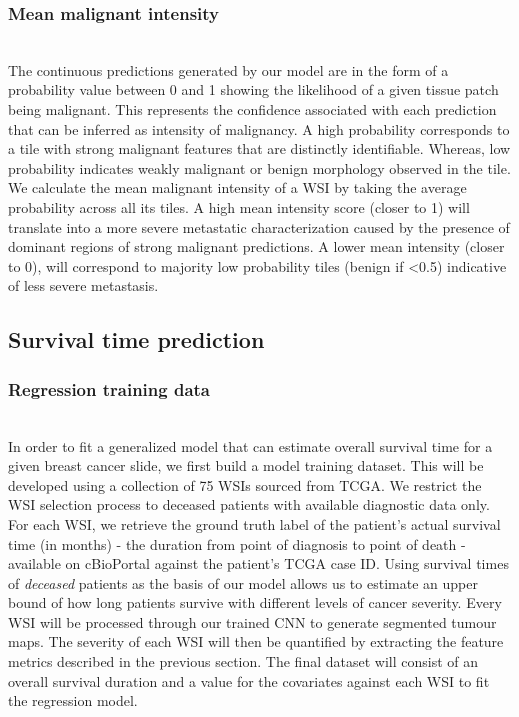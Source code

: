 \documentclass{l4proj}
\begin{document}
\subsubsection{Mean malignant intensity}
\hfill\\
The continuous predictions generated by our model are in the form of a probability value between 0 and 1 showing the likelihood of a given tissue patch being malignant. This represents the confidence  associated with each prediction that can be inferred as intensity of malignancy. A high probability corresponds to a tile with strong malignant features that are distinctly identifiable. Whereas, low probability indicates weakly malignant or benign morphology observed in the tile. We calculate the mean malignant intensity of a WSI by taking the average probability across all its tiles. A high mean intensity score (closer to 1) will translate into a more severe metastatic characterization caused by the presence of dominant regions of strong malignant predictions. A lower mean intensity (closer to 0), will correspond to majority low probability tiles (benign if <0.5) indicative of less severe metastasis. 

\subsection{Survival time prediction}
\subsubsection{Regression training data}
\hfill\\
In order to fit a generalized model that can estimate overall survival time for a given breast cancer slide, we first build a model training dataset. This will be developed using a collection of 75 WSIs sourced from TCGA. We restrict the WSI selection process to deceased patients with available diagnostic data only. For each WSI, we retrieve the ground truth label of the patient's actual survival time (in months) - the duration from point of diagnosis to point of death - available on cBioPortal against the patient's TCGA case ID. Using survival times of \textit{deceased} patients as the basis of our model allows us to estimate an upper bound of how long patients survive with different levels of cancer severity. Every WSI will be processed through our trained CNN to generate segmented tumour maps. The severity of each WSI will then be quantified by extracting the feature metrics described in the previous section. The final dataset will consist of an overall survival duration and a value for the covariates against each WSI to fit the regression model. \\
\end{document}

